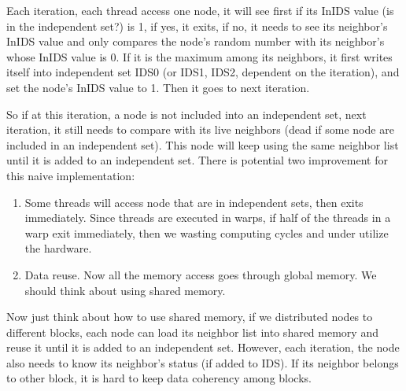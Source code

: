\documentclass[12pt] {article}
\begin{document}
Each iteration, each thread access one node, it will see first if its InIDS value (is in the independent set?) is 1, if yes, it exits, if no, it needs to see its neighbor's InIDS value and only compares the node's random number with its neighbor's whose InIDS value is 0. If it is the maximum among its neighbors, it first writes itself into independent set IDS0 (or IDS1, IDS2, dependent on the iteration), and set the node's InIDS value to 1. Then it goes to next iteration. 

So if at this iteration, a node is not included into an independent set, next iteration, it still needs to compare with its live neighbors (dead if some node are included in an independent set). This node will keep using the same neighbor list until it is added to an independent set. There is potential two improvement for this naive implementation: 
\begin{enumerate}
\item Some threads will access node that are in independent sets, then exits immediately. Since threads are executed in warps, if half of the threads in a warp exit immediately, then we wasting computing cycles and under utilize the hardware. 
\item Data reuse. Now all the memory access goes through global memory. We should think about using shared memory.
\end{enumerate}

Now just think about how to use shared memory, if we distributed nodes to different blocks, each node can load its neighbor list into shared memory and reuse it until it is added to an independent set. However, each iteration, the node also needs to know its neighbor's status (if added to IDS). If its neighbor belongs to other block, it is hard to keep data coherency among blocks. 
\end{document}
